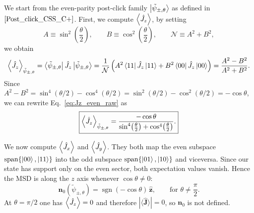 We start from the even-parity post-click family $\ket{\tilde{\psi}_{\pm,\theta}}$ as defined in $\eqref{Post_click_CSS_C+}$. First, we compute \(\expval{\hat J_z}\), by setting
\begin{equation}
	A\equiv \sin^{2}\!\left(\frac{\theta}{2}\right),
	\qquad
	B\equiv \cos^{2}\!\left(\frac{\theta}{2}\right),
	\qquad
	\mathcal{N}\equiv A^{2}+B^{2},
\end{equation}
we obtain
\begin{equation}
	\expval{\hat J_z}_{\tilde{\psi}_{\pm,\theta}}
	=
	\bra{\tilde{\psi}_{\pm,\theta}}\hat J_z\ket{\tilde{\psi}_{\pm,\theta}}
	=
	\frac{1}{\mathcal{N}}
	\left(
	A^{2}\bra{11}\hat J_z\ket{11}
	+
	B^{2}\bra{00}\hat J_z\ket{00}
	\right)
	=
	\frac{A^{2}-B^{2}}{A^{2}+B^{2}}.
	\label{eq:Jz_even_raw}
\end{equation}
Since \(A^{2}-B^{2}=\sin^{4}(\theta/2)-\cos^{4}(\theta/2)=\sin^{2}(\theta/2)-\cos^{2}(\theta/2)=-\cos\theta\),
we can rewrite Eq.~\eqref{eq:Jz_even_raw} as
\begin{equation}
	\boxed{
		\expval{\hat J_z}_{\tilde{\psi}_{\pm,\theta}}
		=
		\frac{-\cos\theta}{\sin^{4}\!\left(\frac{\theta}{2}\right)+\cos^{4}\!\left(\frac{\theta}{2}\right)}.}
	\label{eq:Jz_even_final}
\end{equation}

We now compute \(\expval{\hat J_x}\) and \(\expval{\hat J_y}\). They both map the even subspace \(\mathrm{span}\{\ket{00},\ket{11}\}\) into the odd subspace
\(\mathrm{span}\{\ket{01},\ket{10}\}\) and viceversa. Since our state has support only on the even sector, both expectation values vanish.
Hence the MSD is along the \(z\) axis whenever \(\cos\theta\neq 0\):
\begin{equation}
	\boxed{
		\mathbf{n}_0(\tilde{\psi}_{\pm,\theta})
		=
		\operatorname{sgn}(-\cos\theta)\,\hat{\mathbf{z}},
		\qquad
		\text{for }\theta\neq \frac{\pi}{2}.}
	\label{eq:MSD_even}
\end{equation}
At \(\theta=\pi/2\) one has \(\expval{\hat J_z}=0\) and therefore \(\left|\langle \hat{\mathbf{J}} \rangle\right|=0\),
so \(\mathbf{n}_0\) is not defined.

